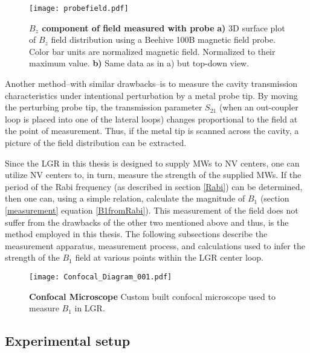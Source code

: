 \begin{figure}[t!]
\centering
\texttt{[image: probefield.pdf]}  
\caption{\textbf{$B_z$ component of field measured with probe} \textbf{a)} 3D surface plot of $B_z$ field distribution using a Beehive 100B magnetic field probe. Color bar units are normalized magnetic field. Normalized to their maximum value. \textbf{b)} Same data as in a) but top-down view. }
\label{LGR_probe}
\end{figure}

Another method--with similar drawbacks--is to measure the cavity transmission characteristics under intentional perturbation by a metal probe tip. By moving the perturbing probe tip, the transmission parameter $S_{21}$ (when an out-coupler loop is placed into one of the lateral loops) changes proportional to the field at the point of measurement. Thus, if the metal tip is scanned across the cavity, a picture of the field distribution can be extracted.  

Since the LGR in this thesis is designed to supply MWs to NV centers, one can utilize NV centers to, in turn, measure the strength of the supplied MWs. If the period of the Rabi frequency (as described in section \ref{Rabi}) can be determined, then one can, using a simple relation, calculate the magnitude of $B_1$ (section \ref{measurement} equation \ref{B1fromRabi}). This measurement of the field does not suffer from the drawbacks of the other two mentioned above and thus, is the method employed in this thesis. The following subsections describe the measurement apparatus, measurement process, and calculations used to infer the strength of the $B_1$ field at various points within the LGR center loop.

\begin{landscape}
\begin{figure}[b!]
\centering
\texttt{[image: Confocal\_Diagram\_001.pdf]}  
\caption{\textbf{Confocal Microscope} Custom built confocal microscope used to measure $B_1$ in LGR.}
\label{LGR_confocal_diagram}
\end{figure}
\end{landscape}

\subsection{Experimental setup} \label{setup}

